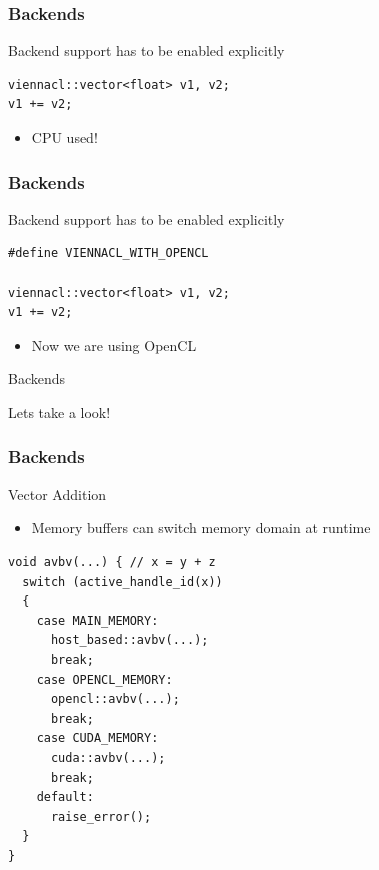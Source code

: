 \begin{frame}[fragile]
\frametitle{Backends}

\begin{block}{Backend support has to be enabled explicitly}
\vspace{0.83cm}
\begin{lstlisting}
viennacl::vector<float> v1, v2;
v1 += v2;
\end{lstlisting}

  \begin{itemize}
   \item CPU used!
  \end{itemize}
\end{block}

\end{frame}



\begin{frame}[fragile]
\frametitle{Backends}

\begin{block}{Backend support has to be enabled explicitly}
\begin{lstlisting}
#define VIENNACL_WITH_OPENCL

viennacl::vector<float> v1, v2;
v1 += v2;
\end{lstlisting}

  \begin{itemize}
   \item Now we are using OpenCL
  \end{itemize}
\end{block}

\end{frame}



\begin{frame}{Backends}

Lets take a look!

\end{frame}




\begin{frame}[fragile]
\frametitle{Backends}

 \begin{block}{Vector Addition}
  \begin{itemize}
   \item Memory buffers can switch memory domain at runtime
  \end{itemize}
  \begin{lstlisting}
void avbv(...) { // x = y + z
  switch (active_handle_id(x))
  {
    case MAIN_MEMORY:
      host_based::avbv(...);
      break;
    case OPENCL_MEMORY:
      opencl::avbv(...);
      break;
    case CUDA_MEMORY:
      cuda::avbv(...);
      break;
    default: 
      raise_error();
  }
}
\end{lstlisting}
 \end{block}

\end{frame}



